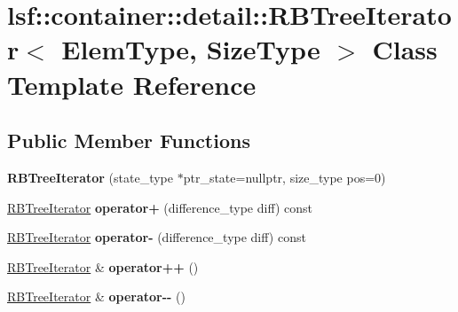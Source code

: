 \hypertarget{classlsf_1_1container_1_1detail_1_1RBTreeIterator}{
\section{lsf::container::detail::RBTreeIterator$<$ ElemType, SizeType $>$ Class Template Reference}
\label{classlsf_1_1container_1_1detail_1_1RBTreeIterator}
}
\subsection*{Public Member Functions}
\begin{DoxyCompactItemize}
\item 
\hypertarget{classlsf_1_1container_1_1detail_1_1RBTreeIterator_af6abb51aaa3b7dc437b113f043eaa159}{
{\bfseries RBTreeIterator} (state\_\-type $\ast$ptr\_\-state=nullptr, size\_\-type pos=0)}
\label{classlsf_1_1container_1_1detail_1_1RBTreeIterator_af6abb51aaa3b7dc437b113f043eaa159}

\item 
\hypertarget{classlsf_1_1container_1_1detail_1_1RBTreeIterator_a8186169482f8d458816e455dc20403fc}{
\hyperlink{classlsf_1_1container_1_1detail_1_1RBTreeIterator}{RBTreeIterator} {\bfseries operator+} (difference\_\-type diff) const }
\label{classlsf_1_1container_1_1detail_1_1RBTreeIterator_a8186169482f8d458816e455dc20403fc}

\item 
\hypertarget{classlsf_1_1container_1_1detail_1_1RBTreeIterator_a00f2020447efee7e352f96535beb9ca3}{
\hyperlink{classlsf_1_1container_1_1detail_1_1RBTreeIterator}{RBTreeIterator} {\bfseries operator-\/} (difference\_\-type diff) const }
\label{classlsf_1_1container_1_1detail_1_1RBTreeIterator_a00f2020447efee7e352f96535beb9ca3}

\item 
\hypertarget{classlsf_1_1container_1_1detail_1_1RBTreeIterator_ae6e45a86ba4efc258bb70ebe05cbe712}{
\hyperlink{classlsf_1_1container_1_1detail_1_1RBTreeIterator}{RBTreeIterator} \& {\bfseries operator++} ()}
\label{classlsf_1_1container_1_1detail_1_1RBTreeIterator_ae6e45a86ba4efc258bb70ebe05cbe712}

\item 
\hypertarget{classlsf_1_1container_1_1detail_1_1RBTreeIterator_a919e86a6d1b725253ca4037f6f3031e0}{
\hyperlink{classlsf_1_1container_1_1detail_1_1RBTreeIterator}{RBTreeIterator} \& {\bfseries operator-\/-\/} ()}
\label{classlsf_1_1container_1_1detail_1_1RBTreeIterator_a919e86a6d1b725253ca4037f6f3031e0}


\end{DoxyCompactItemize}
